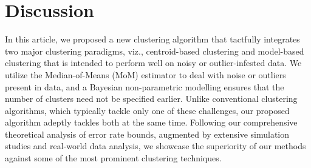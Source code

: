 \documentclass{article}
\begin{document}

\section{Discussion}

In this article, we proposed a new clustering algorithm that tactfully integrates two major clustering paradigms, viz., centroid-based clustering and model-based clustering that is intended to perform  well on noisy or outlier-infested data. We utilize the Median-of-Means (MoM) estimator to deal with noise or outliers present in data, and a Bayesian non-parametric modelling ensures that the number of clusters need not be specified earlier. Unlike conventional clustering algorithms, which typically tackle only one of these challenges, our proposed algorithm adeptly tackles both at the same time. Following our comprehensive theoretical analysis of error rate bounds, augmented by extensive simulation studies and real-world data analysis, we showcase the superiority of our methods against some of the most prominent clustering techniques.
\end{document}
